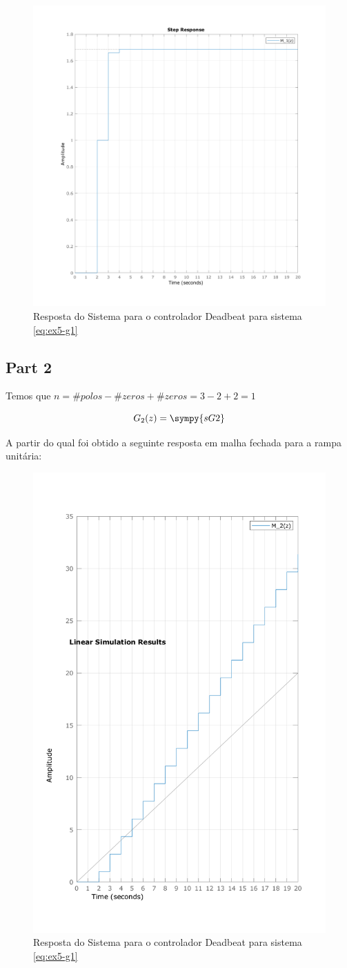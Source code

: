 \documentclass[a4paper,11pt]{article}
\begin{document}
\begin{figure}[H]
    \centering
    \includegraphics[width=0.6\linewidth]{img/exsim5-g1-deadbeat-sim.png}
    \caption{Resposta do Sistema para o controlador Deadbeat para sistema \ref{eq:ex5-g1}}
\end{figure}

\subsection{Part 2}

Temos que $n = \#polos - \#zeros + \#zeros = 3  - 2 + 2 = 1$

\begin{equation}\label{eq:ex5-g2}
    G_2(z) = \sympy{sG2}
\end{equation}

A partir do qual foi obtido a seguinte resposta em malha fechada para a rampa unitária:

\begin{figure}[H]
    \centering
    \includegraphics[width=0.6\linewidth]{img/exsim5-g2-deadbeat-sim.png}
    \caption{Resposta do Sistema para o controlador Deadbeat para sistema \ref{eq:ex5-g1}}
\end{figure}
\end{document}
